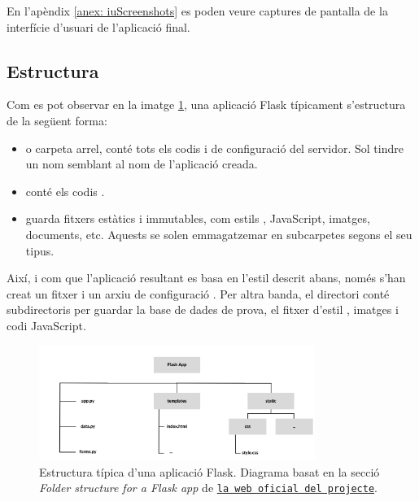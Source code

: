 \documentclass{tfgitic}[2022/06/30]
\begin{document}
En l'apèndix \ref{anex: iuScreenshots} es poden veure captures de pantalla de la interfície d'usuari de l'aplicació final.

\subsection{Estructura}
Com es pot observar en la imatge \ref{image:flaskStructure}, una aplicació Flask típicament s'estructura de la següent forma:

\begin{itemize}
    \item {} o carpeta arrel, conté tots els codis  i de configuració del servidor. Sol tindre un nom semblant al nom de l'aplicació creada.
    \item {} conté els codis .
    \item {} guarda fitxers estàtics i immutables, com estils , JavaScript, imatges, documents, etc. Aquests se solen emmagatzemar en subcarpetes segons el seu tipus.
\end{itemize}

Així, i com que l'aplicació resultant es basa en l'estil  descrit abans, només s'han creat un fitxer  i un arxiu de configuració . Per altra banda, el directori  conté subdirectoris per guardar la base de dades de prova, el fitxer d'estil , imatges i codi JavaScript.

\begin{figure}[h]
\centering
\includegraphics[width=0.8\textwidth]{img/Flask App.png}
\caption{Estructura típica d'una aplicació Flask. Diagrama basat en la secció \emph{Folder structure for a Flask app} de \texttt{\href{https://python-adv-web-apps.readthedocs.io/en/latest/flask3.html}{la web oficial del projecte}}.}
\label{image:flaskStructure}
\end{figure}
\end{document}
